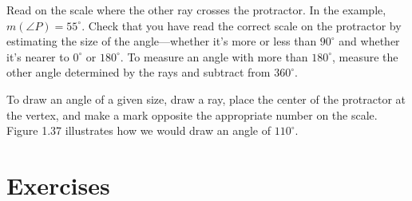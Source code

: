 \documentclass[12pt]{book} %
\begin{document}

Read on the scale where the other ray crosses the protractor. In the example, $m(\angle P)=55^\circ$. Check that you have read the correct scale on the protractor by estimating the size of the angle---whether it's more or less than $90^\circ$ and whether it's nearer to $0^\circ$ or $180^\circ$. To measure an angle with more than $180^\circ$, measure the other angle determined by the rays and subtract from $360^\circ$.

To draw an angle of a given size, draw a ray, place the center of the protractor at the vertex, and make a mark opposite the appropriate number on the scale. Figure 1.37 illustrates how we would draw an angle of $110^\circ$.


\section*{Exercises}
\end{document}
